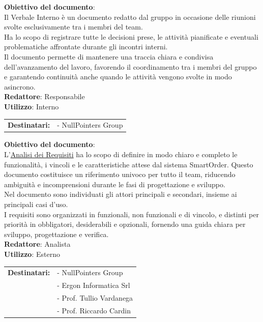 	\label{sec: verbali-interni}
	\textbf{Obiettivo del documento}:\\
	Il Verbale Interno è un documento redatto dal gruppo in occasione delle riunioni svolte esclusivamente tra i membri del team.\\
	Ha lo scopo di registrare tutte le decisioni prese, le attività pianificate e eventuali problematiche affrontate durante gli incontri interni.\\
	Il documento permette di mantenere una traccia chiara e condivisa dell’avanzamento del lavoro, favorendo il coordinamento tra i membri del gruppo e garantendo continuità anche quando le attività vengono svolte in modo asincrono.\\[0.5em]
	\medskip
	\textbf{Redattore}: Responsabile\\
	\medskip
	\textbf{Utilizzo}: Interno\\
	\medskip 
	\begin{tabular}{@{}l l}
		\textbf{Destinatari:} & - NullPointers Group
	\end{tabular}

	\textbf{Obiettivo del documento}:\\
	L’\href{https://nullpointersgroup.github.io/Documentazione/output/RTB/Documenti%20Esterni/Analisi_dei_Requisiti.pdf}{Analisi dei Requisiti} ha lo scopo di definire in modo chiaro e completo le funzionalità, i vincoli e le caratteristiche attese dal sistema SmartOrder. Questo documento costituisce un riferimento univoco per tutto il team, riducendo ambiguità e incomprensioni durante le fasi di progettazione e sviluppo.\\
	Nel documento sono individuati gli attori principali e secondari, insieme ai principali casi d’uso.\\ 
	I requisiti sono organizzati in funzionali, non funzionali e di vincolo, e distinti per priorità in obbligatori, desiderabili e opzionali, fornendo una guida chiara per sviluppo, progettazione e verifica.\\[0.5em]
	\medskip
	\textbf{Redattore}: Analista\\
	\medskip
	\textbf{Utilizzo}: Esterno\\
	\medskip 
	\begin{tabular}{@{}l l}
		\textbf{Destinatari:} & - NullPointers Group\\
		                      & - Ergon Informatica Srl\\
		                      & - Prof. Tullio Vardanega\\
							  & - Prof. Riccardo Cardin
	\end{tabular}

